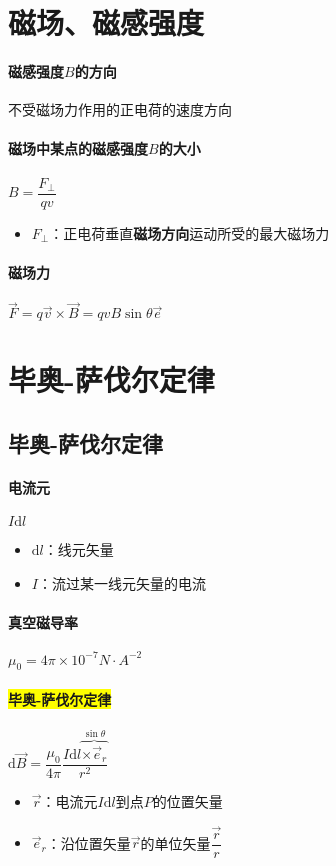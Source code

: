 \documentclass[UTF8,a4paper,12pt,scheme=chinese]{ctexbook}
\newcommand{\sll}[1]{\overrightarrow{#1}}
\newcommand{\ud}{\mathrm{d}}
\newcommand{\hl}[1]{\colorbox{yellow}{#1}}
\begin{document}
	\section{磁场、磁感强度}
	\paragraph{磁感强度$ B $的方向}不受磁场力作用的正电荷的速度方向
	\paragraph{磁场中某点的磁感强度$ B $的大小}$ B=\dfrac{F_\perp}{qv} $
	\begin{itemize}
		\item $ F_\perp $：正电荷垂直\textbf{磁场方向}运动所受的最大磁场力
	\end{itemize}
	\paragraph{磁场力}$ \sll{F}=q\sll{v}\times\sll{B}=qvB\sin\theta\sll{e} $
	\section{毕奥-萨伐尔定律}
	\subsection{毕奥-萨伐尔定律}
	\paragraph{电流元}$ I\ud{l} $
	\begin{itemize}
		\item $ \ud{l} $：线元矢量
		\item $ I $：流过某一线元矢量的电流
	\end{itemize}
	\paragraph{真空磁导率}$ \mu_0=4\pi\times10^{-7}N\cdot A^{-2} $
	\paragraph{\hl{毕奥-萨伐尔定律}}$ \ud\sll{B}=\dfrac{\mu_0}{4\pi}\dfrac{I\ud{l}\overbrace{\times\sll{e}_r}^{\sin\theta}}{r^2} $
	\begin{itemize}
		\item $ \sll{r} $：电流元$ I\ud{l} $到点$ P $的位置矢量
		\item $ \sll{e}_r $：沿位置矢量$ \sll{r} $的单位矢量$ \dfrac{\sll{r}}{r} $
	\end{itemize}
\end{document}
